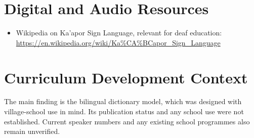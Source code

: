 \documentclass[12pt]{article}
\begin{document}
\section{Digital and Audio Resources}
\begin{itemize}
\item Wikipedia on Ka'apor Sign Language, relevant for deaf education: \url{https://en.wikipedia.org/wiki/Ka%CA%BCapor_Sign_Language}
\end{itemize}

\section{Curriculum Development Context}
The main finding is the bilingual dictionary model, which was designed with village-school use in mind. Its publication status and any school use were not established. Current speaker numbers and any existing school programmes also remain unverified.
\end{document}
